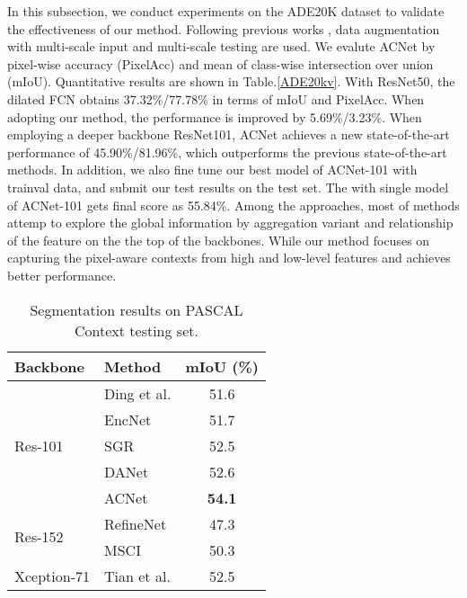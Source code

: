 \documentclass[10pt,twocolumn,letterpaper]{article}
\begin{document}
In this subsection, we conduct experiments on the ADE20K dataset to
validate the effectiveness of our method.  Following previous works \cite{huang2018ccnet, li2018beyond,encnet,pspnet, zhao2018psanet}, data augmentation with multi-scale input and multi-scale testing are used.
We evalute ACNet by pixel-wise accuracy (PixelAcc) and mean of
class-wise intersection over union (mIoU).
Quantitative results are shown in Table.\ref{ADE20kv}. With ResNet50, the dilated FCN obtains 37.32\%/77.78\% in terms of mIoU and PixelAcc. When adopting our method, the performance is  improved by 5.69\%/3.23\%. When employing a deeper backbone ResNet101, ACNet achieves a new state-of-the-art performance
of 45.90\%/81.96\%, which outperforms the previous state-of-the-art methods. In addition,  we also fine tune our best model of ACNet-101 with trainval data, and submit our test results on the test set. The with single model of ACNet-101 gets final score as 55.84\%.
Among the approaches, most of methods \cite{pspnet,encnet,li2018beyond,zhang2017scale,zhao2018psanet,huang2018ccnet} attemp to  explore the global information by  aggregation  variant and relationship of the feature on the the top of the backbones. While our method focuses on  capturing the pixel-aware contexts from high and low-level features and achieves better performance.



\begin{table}[t]
\begin{center}
\begin{tabular} {l |l | c }
    \toprule[1pt]
    Backbone & Method & mIoU (\%)\\
    \hline \hline
    \multirow{5}{*}{Res-101}

    &Ding et al.\cite{ding2018context} &  51.6 \\
   &EncNet  \cite{encnet} &  51.7 \\
  &SGR \cite{liang2018symbolic}&52.5\\
   &DANet  \cite{fu2018dual} &  52.6 \\
    &    ACNet & \textbf{54.1} \\
       \hline
 \multirow{2}{*}{Res-152}& RefineNet \cite{refinenet} &  47.3\\ 
&MSCI\cite{Lin_2018_ECCV} &50.3\\
       \hline
Xception-71& Tian et al.\cite{CVPR19Tian7} &  52.5 \\
       \hline
    \bottomrule[1pt]
 \end{tabular}
\end{center}
\caption{Segmentation results on PASCAL Context  testing set.}
\vspace{-1em}
\label{pcontext}
\end{table}
\end{document}
